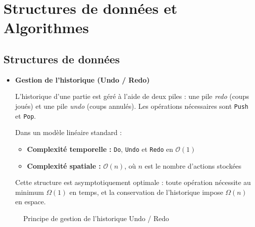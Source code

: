 \documentclass[9pt]{extarticle} %
\begin{document}
\section{Structures de données et Algorithmes}

\subsection{Structures de données}
\begin{itemize}
    \item[$\bullet$] \textbf{Gestion de l’historique (Undo / Redo)}  

    L’historique d’une partie est géré à l’aide de deux piles : une pile \textit{redo} (coups joués) et une pile \textit{undo} (coups annulés).  
    Les opérations nécessaires sont \texttt{Push} et \texttt{Pop}.

    Dans un modèle linéaire standard :
    \begin{itemize}
        \item \textbf{Complexité temporelle :} \texttt{Do}, \texttt{Undo} et \texttt{Redo} en $\mathcal{O}(1)$
        \item \textbf{Complexité spatiale :} $\mathcal{O}(n)$, où $n$ est le nombre d’actions stockées
    \end{itemize}

    Cette structure est asymptotiquement optimale : toute opération nécessite au minimum $\Omega(1)$ en temps, et la conservation de l’historique impose $\Omega(n)$ en espace.
\end{itemize}

\bigskip

\begin{figure}[h]
\centering
{}

\caption{Principe de gestion de l’historique Undo / Redo}
\end{figure}
\end{document}
